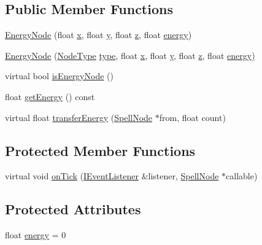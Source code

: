 \subsection*{Public Member Functions}
\begin{DoxyCompactItemize}
\item 
\hyperlink{class_energy_node_a607a0f6e31ff16ff882440119739ad66}{Energy\-Node} (float \hyperlink{class_spell_node_a916f2a709a674dd2a61530b6acc339cc}{x}, float \hyperlink{class_spell_node_a754d80fd0fd82dbc12443b5f277b9fb4}{y}, float \hyperlink{class_spell_node_aff090331ff1bd816a22e974a50c1a180}{z}, float \hyperlink{class_energy_node_ac2cd46828178316e24f339489f553852}{energy})
\item 
\hyperlink{class_energy_node_aa1a37a897c0e95fa3c153ea6993c5237}{Energy\-Node} (\hyperlink{_spell_node_8hpp_acac9cbaeea226ed297804c012dc12b16}{Node\-Type} \hyperlink{class_spell_node_ae897f4f135608a9c71948b5f703aeb99}{type}, float \hyperlink{class_spell_node_a916f2a709a674dd2a61530b6acc339cc}{x}, float \hyperlink{class_spell_node_a754d80fd0fd82dbc12443b5f277b9fb4}{y}, float \hyperlink{class_spell_node_aff090331ff1bd816a22e974a50c1a180}{z}, float \hyperlink{class_energy_node_ac2cd46828178316e24f339489f553852}{energy})
\item 
virtual bool \hyperlink{class_energy_node_a3a215be078964713e490198ee311d70f}{is\-Energy\-Node} ()
\item 
float \hyperlink{class_energy_node_aac6faa1fe6389c0f9ee63611cd322245}{get\-Energy} () const 
\item 
virtual float \hyperlink{class_energy_node_a04b3fe7a8aa49157a5c66ee8e25cfb3b}{transfer\-Energy} (\hyperlink{class_spell_node}{Spell\-Node} $\ast$from, float count)
\end{DoxyCompactItemize}
\subsection*{Protected Member Functions}
\begin{DoxyCompactItemize}
\item 
virtual void \hyperlink{class_energy_node_ab52474e2e15ff2af2d969b6a88a778f7}{on\-Tick} (\hyperlink{class_i_event_listener}{I\-Event\-Listener} \&listener, \hyperlink{class_spell_node}{Spell\-Node} $\ast$callable)
\end{DoxyCompactItemize}
\subsection*{Protected Attributes}
\begin{DoxyCompactItemize}
\item 
float \hyperlink{class_energy_node_ac2cd46828178316e24f339489f553852}{energy} = 0
\end{DoxyCompactItemize}
